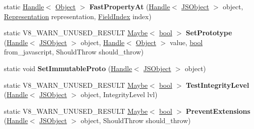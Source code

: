 \begin{DoxyCompactItemize}
\item 
\mbox{\label{classv8_1_1internal_1_1JSObject_a6eb754b8c258aa12505635627566fa22}} 
static \mbox{\hyperlink{classv8_1_1internal_1_1Handle}{Handle}}$<$ \mbox{\hyperlink{classv8_1_1internal_1_1Object}{Object}} $>$ {\bfseries Fast\+Property\+At} (\mbox{\hyperlink{classv8_1_1internal_1_1Handle}{Handle}}$<$ \mbox{\hyperlink{classv8_1_1internal_1_1JSObject}{J\+S\+Object}} $>$ object, \mbox{\hyperlink{classv8_1_1internal_1_1Representation}{Representation}} representation, \mbox{\hyperlink{classv8_1_1internal_1_1FieldIndex}{Field\+Index}} index)
\item 
\mbox{\label{classv8_1_1internal_1_1JSObject_a7019b0abb25e7f2d61b70947e000d9e7}} 
static V8\+\_\+\+W\+A\+R\+N\+\_\+\+U\+N\+U\+S\+E\+D\+\_\+\+R\+E\+S\+U\+LT \mbox{\hyperlink{classv8_1_1Maybe}{Maybe}}$<$ \mbox{\hyperlink{classbool}{bool}} $>$ {\bfseries Set\+Prototype} (\mbox{\hyperlink{classv8_1_1internal_1_1Handle}{Handle}}$<$ \mbox{\hyperlink{classv8_1_1internal_1_1JSObject}{J\+S\+Object}} $>$ object, \mbox{\hyperlink{classv8_1_1internal_1_1Handle}{Handle}}$<$ \mbox{\hyperlink{classv8_1_1internal_1_1Object}{Object}} $>$ value, \mbox{\hyperlink{classbool}{bool}} from\+\_\+javascript, Should\+Throw should\+\_\+throw)
\item 
\mbox{\label{classv8_1_1internal_1_1JSObject_afa8bda3d05c5533c91174494a0f51022}} 
static void {\bfseries Set\+Immutable\+Proto} (\mbox{\hyperlink{classv8_1_1internal_1_1Handle}{Handle}}$<$ \mbox{\hyperlink{classv8_1_1internal_1_1JSObject}{J\+S\+Object}} $>$ object)
\item 
\mbox{\label{classv8_1_1internal_1_1JSObject_a6386daf1cab8152491a05737cfa5d089}} 
static V8\+\_\+\+W\+A\+R\+N\+\_\+\+U\+N\+U\+S\+E\+D\+\_\+\+R\+E\+S\+U\+LT \mbox{\hyperlink{classv8_1_1Maybe}{Maybe}}$<$ \mbox{\hyperlink{classbool}{bool}} $>$ {\bfseries Test\+Integrity\+Level} (\mbox{\hyperlink{classv8_1_1internal_1_1Handle}{Handle}}$<$ \mbox{\hyperlink{classv8_1_1internal_1_1JSObject}{J\+S\+Object}} $>$ object, Integrity\+Level lvl)
\item 
\mbox{\label{classv8_1_1internal_1_1JSObject_af05c52322395b156901a77e205704fda}} 
static V8\+\_\+\+W\+A\+R\+N\+\_\+\+U\+N\+U\+S\+E\+D\+\_\+\+R\+E\+S\+U\+LT \mbox{\hyperlink{classv8_1_1Maybe}{Maybe}}$<$ \mbox{\hyperlink{classbool}{bool}} $>$ {\bfseries Prevent\+Extensions} (\mbox{\hyperlink{classv8_1_1internal_1_1Handle}{Handle}}$<$ \mbox{\hyperlink{classv8_1_1internal_1_1JSObject}{J\+S\+Object}} $>$ object, Should\+Throw should\+\_\+throw)

\end{DoxyCompactItemize}
